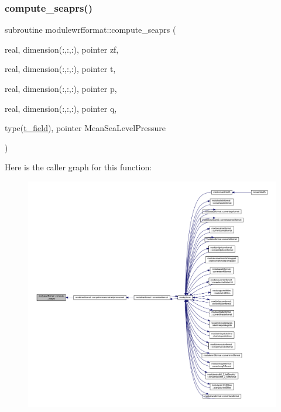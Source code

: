 \subsubsection{\texorpdfstring{compute\+\_\+seaprs()}{compute\_seaprs()}}
{\footnotesize\ttfamily subroutine modulewrfformat\+::compute\+\_\+seaprs (\begin{DoxyParamCaption}\item[{real, dimension(\+:,\+:,\+:), pointer}]{zf,  }\item[{real, dimension(\+:,\+:,\+:), pointer}]{t,  }\item[{real, dimension(\+:,\+:,\+:), pointer}]{p,  }\item[{real, dimension(\+:,\+:,\+:), pointer}]{q,  }\item[{type(\mbox{\hyperlink{structmodulewrfformat_1_1t__field}{t\+\_\+field}}), pointer}]{Mean\+Sea\+Level\+Pressure }\end{DoxyParamCaption})\hspace{0.3cm}{\ttfamily [private]}}

Here is the caller graph for this function\+:\nopagebreak
\begin{figure}[H]
\begin{center}
\leavevmode
\includegraphics[width=350pt]{namespacemodulewrfformat_a06aace8368c071a4250a6cebdbf4bba7_icgraph}
\end{center}
\end{figure}
\mbox{\label{namespacemodulewrfformat_a73668be1d5f33f4ede49ed82d12aa794}} 
